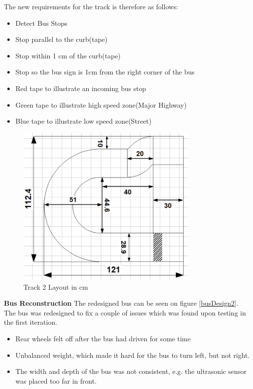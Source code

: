The new requirements for the track is therefore as follows:
\begin{itemize}
  \item Detect Bus Stops
  \item Stop parallel to the curb(tape)
  \item Stop within 1 cm of the curb(tape)
  \item Stop so the bus sign is 1cm from the right corner of the bus
  \item Red tape to illustrate an incoming bus stop
  \item Green tape to illustrate high speed zone(Major Highway)
  \item Blue tape to illustrate low speed zone(Street)
\end{itemize}

\begin{figure}[H]
    \label{Track2Layout}
    \centering
    \includegraphics[width=0.8\textwidth]{Images/Tracks/Track1.PNG}
    \caption{Track 2 Layout in cm}
\end{figure}

\textbf{Bus Reconstruction} \newline
The redesigned bus can be seen on figure \ref{busDesign2}. The bus was redesigned to fix a couple of issues which was found upon testing in the first iteration.

\begin{itemize}
  \item Rear wheels felt off after the bus had driven for some time
  \item Unbalanced weight, which made it hard for the bus to turn left, but not right.
  \item The width and depth of the bus was not consistent, e.g. the ultrasonic sensor was placed too far in front. 

\end{itemize}

